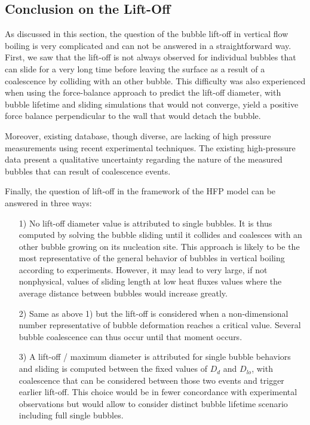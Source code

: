 \subsection{Conclusion on the Lift-Off}

As discussed in this section, the question of the bubble lift-off in vertical flow boiling is very complicated and can not be answered in a straightforward way. First, we saw that the lift-off is not always observed for individual bubbles that can slide for a very long time before leaving the surface as a result of a coalescence by colliding with an other bubble. This difficulty was also experienced when using the force-balance approach to predict the lift-off diameter, with bubble lifetime and sliding simulations that would not converge, \ie yield a positive force balance perpendicular to the wall that would detach the bubble. 

\npar

Moreover, existing database, though diverse, are lacking of high pressure measurements using recent experimental techniques. The existing high-pressure data present a qualitative uncertainty regarding the nature of the measured bubbles that can result of coalescence events.

\npar

Finally, the question of lift-off in the framework of the HFP model can be answered in three ways:

\begin{enumerate}
\item[1)] No lift-off diameter value is attributed to single bubbles.  It is thus computed by solving the bubble sliding until it collides and coalesces with an other bubble growing on its nucleation site. This approach is likely to be the most representative of the general behavior of bubbles in vertical boiling according to experiments. However, it may lead to very large, if not nonphysical, values of sliding length at low heat fluxes values where the average distance between bubbles would increase greatly.

\item[2)] Same as above 1) but the lift-off is considered when a non-dimensional number representative of bubble deformation reaches a critical value. Several bubble coalescence can thus occur until that moment occurs.

\item[3)] A lift-off / maximum diameter is attributed for single bubble behaviors and sliding is computed between the fixed values of $D_{d}$ and $D_{lo}$, with coalescence that can be considered between those two events and trigger earlier lift-off. This choice would be in fewer concordance with experimental observations but would allow to consider distinct bubble lifetime scenario including full single bubbles.
\end{enumerate}



